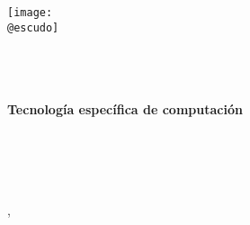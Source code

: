 \begin{titlepage}
    \makeatletter
	\begin{center}
        \vspace{1cm}
		\texttt{[image: \\@escudo]}\vspace{1cm} 
		
		{\LARGE \textbf{\@instEdu\\[0.5ex]
				\@centroEdu\\[2cm]
				\@titulacion}}\\[0.5cm]
        {\large \textbf{Tecnología específica de computación}}\\[1.5cm]
		{\LARGE \textbf{\@tipoDoc}}\\[1cm]	
		{\LARGE \@tituloPrimera}\\ \smallskip%
		\ifdefined\@tituloSegunda{\LARGE \@tituloSegunda}\\[3cm]
		\else \phantom{\LARGE	Texto fantasma}\\[3cm]
		\fi
		{\Large \@autor}\vfill%
	\end{center}
	
	\begin{flushright}
		{\Large \ifspanish \@mesTF \else \@monthTF \fi, \@yearTF}
	\end{flushright}
	
    \makeatother
\end{titlepage}






